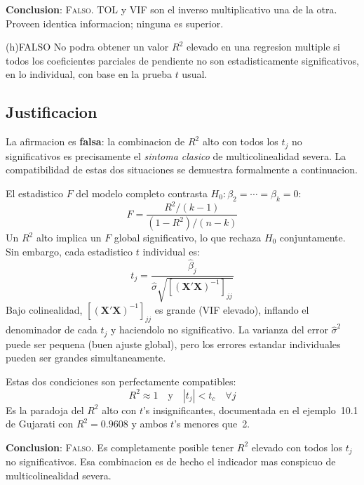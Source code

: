 \documentclass[12pt, letterpaper]{article}
\theoremstyle{remark}
\begin{document}
\textbf{Conclusion}: \textsc{Falso}. TOL y VIF son el inverso multiplicativo
una de la otra. Proveen identica informacion; ninguna es superior.

\bigskip

\begin{verdict}{(h)}{FALSO}
  No podra obtener un valor $R^2$ elevado en una regresion multiple si todos
  los coeficientes parciales de pendiente no son estadisticamente significativos,
  en lo individual, con base en la prueba $t$ usual.
\end{verdict}

\subsection*{Justificacion}

La afirmacion es \textbf{falsa}: la combinacion de $R^2$ alto con todos los
$t_j$ no significativos es precisamente el \emph{sintoma clasico} de
multicolinealidad severa. La compatibilidad de estas dos situaciones se
demuestra formalmente a continuacion.

El estadistico $F$ del modelo completo contrasta $H_0: \beta_2 = \cdots = \beta_k = 0$:
\begin{equation}
  F = \frac{R^2/(k-1)}{(1-R^2)/(n-k)}
  \label{eq:F_global}
\end{equation}
Un $R^2$ alto implica un $F$ global significativo, lo que rechaza
$H_0$ conjuntamente. Sin embargo, cada estadistico $t$ individual es:
\begin{equation}
  t_j = \frac{\hat\beta_j}{\hat\sigma\sqrt{[(\mathbf{X'X})^{-1}]_{jj}}}
  \label{eq:t_individual}
\end{equation}
Bajo colinealidad, $[(\mathbf{X'X})^{-1}]_{jj}$ es grande (VIF elevado),
inflando el denominador de cada $t_j$ y haciendolo no significativo. La
varianza del error $\hat\sigma^2$ puede ser pequena (buen ajuste global),
pero los errores estandar individuales pueden ser grandes simultaneamente.

Estas dos condiciones son perfectamente compatibles:
\begin{equation}
  R^2 \approx 1 \quad \text{y} \quad |t_j| < t_c \quad \forall j
  \label{eq:paradoja}
\end{equation}
Es la paradoja del $R^2$ alto con $t$'s insignificantes, documentada en
el ejemplo~10.1 de Gujarati con $R^2 = 0.9608$ y ambos $t$'s menores que~2.

\textbf{Conclusion}: \textsc{Falso}. Es completamente posible tener $R^2$
elevado con todos los $t_j$ no significativos. Esa combinacion es de hecho
el indicador mas conspicuo de multicolinealidad severa.
\end{document}
